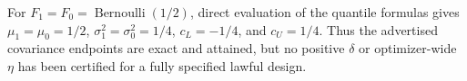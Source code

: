 For \(F_1=F_0=\operatorname{Bernoulli}(1/2)\), direct evaluation of the quantile formulas gives \(\mu_1=\mu_0=1/2\), \(\sigma_1^2=\sigma_0^2=1/4\), \(c_L=-1/4\), and \(c_U=1/4\).  Thus the advertised covariance endpoints are exact and attained, but no positive \(\delta\) or optimizer-wide \(\eta\) has been certified for a fully specified lawful design.